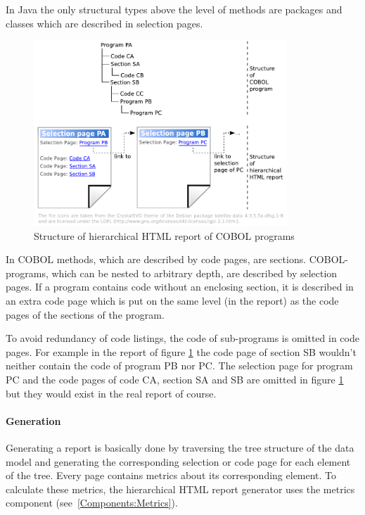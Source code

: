 In Java the only structural types above the level of methods are packages and classes which are described in selection pages.

\begin{figure}[hbtp]
 \centering
 \includegraphics[width=0.85\textwidth]{images/Report/hierarchical_html_cobol.pdf}
 \caption{Structure of hierarchical HTML report of COBOL programs}
 \label{figure:Components:Report:COBOL}
\end{figure}

In COBOL methods, which are described by code pages, are sections. COBOL-programs, which can be nested to arbitrary depth, are described by selection pages. If a program contains code without an enclosing section, it is described in an extra code page which is put on the same level (in the report) as the code pages of the sections of the program.

To avoid redundancy of code listings, the code of sub-programs is omitted in code pages. For example in the report of figure \ref{figure:Components:Report:COBOL} the code page of section SB wouldn't neither contain the code of program PB nor PC. The selection page for program PC and the code pages of code CA, section SA and SB are omitted in figure \ref{figure:Components:Report:COBOL} but they would exist in the real report of course.


\paragraph{Generation} \label{Components:Report:HTML_hierarchic:Generation}

Generating a report is basically done by traversing the tree structure of the data model and generating the corresponding selection or code page for each element of the tree. Every page contains metrics about its corresponding element. To calculate these metrics, the hierarchical HTML report generator uses the metrics component (see~\ref{Components:Metrics}).


